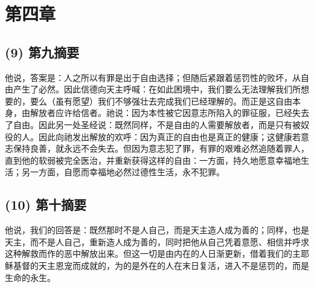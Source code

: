 
\section{第四章}


\subsection{(9) 第九摘要}

他说，答案是：人之所以有罪是出于自由选择；但随后紧跟着惩罚性的败坏，从自由产生了必然。因此信德向天主呼喊：在如此困境中，我们要么无法理解我们所想要的，要么（虽有愿望）我们不够强壮去完成我们已经理解的。而正是这自由本身，由解放者应许给信者。祂说：因为本性被它因意志所陷入的罪征服，已经失去了自由。因此另一处圣经说：既然同样，不是自由的人需要解放者，而是只有被奴役的人。因此向祂发出解放的欢呼：因为真正的自由也是真正的健康；这健康若意志保持良善，就永远不会失去。但因为意志犯了罪，有罪的艰难必然追随着罪人，直到他的软弱被完全医治，并重新获得这样的自由：一方面，持久地愿意幸福地生活；另一方面，自愿而幸福地必然过德性生活，永不犯罪。\par


\subsection{(10) 第十摘要}

他说，我们的回答是：既然那时不是人自己，而是天主造人成为善的；同样，也是天主，而不是人自己，重新造人成为善的，同时把他从自己凭着意愿、相信并呼求这种解救而作的恶中解放出来。但这一切是由内在的人日渐更新，借着我们的主耶稣基督的天主恩宠而成就的，为的是外在的人在末日复活，进入不是惩罚的，而是生命的永生。\par

